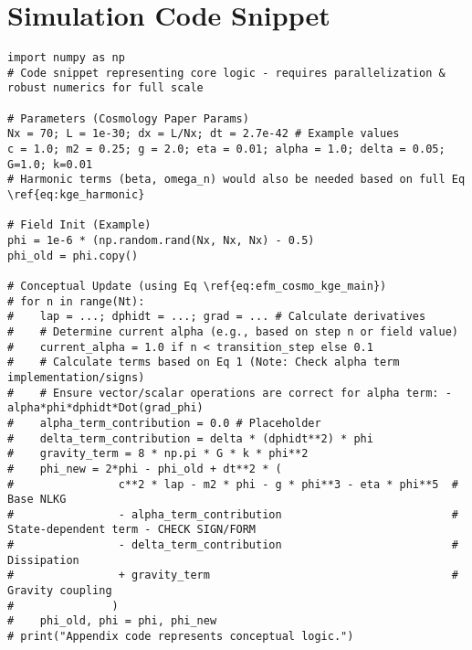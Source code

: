 \documentclass[11pt]{article}
\begin{document}
\section{Simulation Code Snippet}
\begin{lstlisting}
import numpy as np
# Code snippet representing core logic - requires parallelization & robust numerics for full scale

# Parameters (Cosmology Paper Params)
Nx = 70; L = 1e-30; dx = L/Nx; dt = 2.7e-42 # Example values
c = 1.0; m2 = 0.25; g = 2.0; eta = 0.01; alpha = 1.0; delta = 0.05; G=1.0; k=0.01
# Harmonic terms (beta, omega_n) would also be needed based on full Eq \ref{eq:kge_harmonic}

# Field Init (Example)
phi = 1e-6 * (np.random.rand(Nx, Nx, Nx) - 0.5)
phi_old = phi.copy()

# Conceptual Update (using Eq \ref{eq:efm_cosmo_kge_main})
# for n in range(Nt):
#    lap = ...; dphidt = ...; grad = ... # Calculate derivatives
#    # Determine current alpha (e.g., based on step n or field value)
#    current_alpha = 1.0 if n < transition_step else 0.1
#    # Calculate terms based on Eq 1 (Note: Check alpha term implementation/signs)
#    # Ensure vector/scalar operations are correct for alpha term: - alpha*phi*dphidt*Dot(grad_phi)
#    alpha_term_contribution = 0.0 # Placeholder
#    delta_term_contribution = delta * (dphidt**2) * phi
#    gravity_term = 8 * np.pi * G * k * phi**2
#    phi_new = 2*phi - phi_old + dt**2 * (
#                c**2 * lap - m2 * phi - g * phi**3 - eta * phi**5  # Base NLKG
#                - alpha_term_contribution                          # State-dependent term - CHECK SIGN/FORM
#                - delta_term_contribution                          # Dissipation
#                + gravity_term                                     # Gravity coupling
#               )
#    phi_old, phi = phi, phi_new
# print("Appendix code represents conceptual logic.")
\end{lstlisting}
\end{document}
